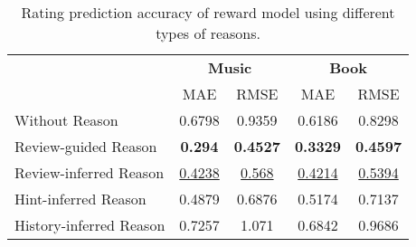 









\begin{table}[t]
\centering
\caption{Rating prediction accuracy of reward model using different types of reasons.}
\begin{tabular}{lcccc}
\toprule
\multirow{2}{*}{} & \multicolumn{2}{c}{\textbf{Music}} & \multicolumn{2}{c}{\textbf{Book}} \\ \cmidrule(lr){2-3} \cmidrule(lr){4-5}
                                & MAE             & RMSE            & MAE             & RMSE            \\ \midrule
Without Reason               & 0.6798          & 0.9359          & 0.6186          & 0.8298          \\
Review-guided Reason      & \textbf{0.294}   & \textbf{0.4527}  & \textbf{0.3329}  & \textbf{0.4597}  \\
Review-inferred Reason      & \underline{0.4238}           & \underline{0.568}           & \underline{0.4214}           & \underline{0.5394}           \\
Hint-inferred Reason        & 0.4879           & 0.6876          & 0.5174           & 0.7137           \\
History-inferred Reason     & 0.7257           & 1.071           & 0.6842           & 0.9686           \\ \midrule
\end{tabular}
\label{tab:reward_effect}
\end{table}

